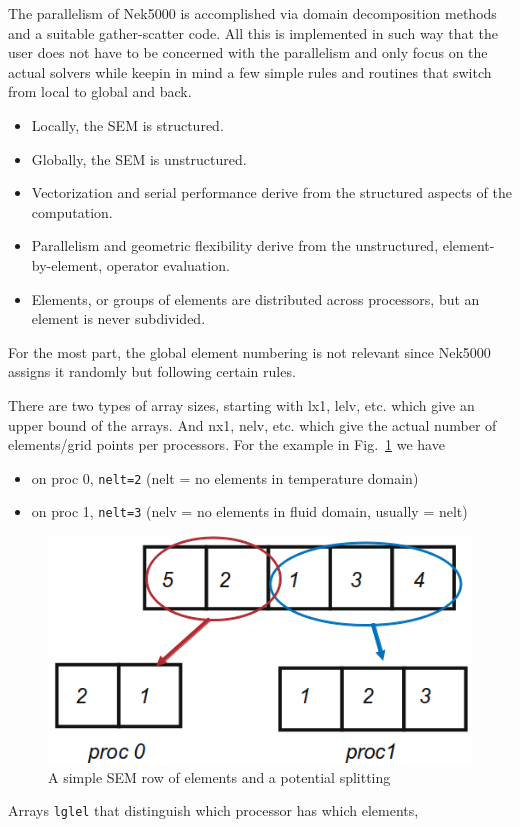 


The parallelism of Nek5000 is accomplished via domain decomposition methods and a suitable gather-scatter code. All this is implemented in such way that the user does not have to be concerned with the parallelism and only focus on the actual solvers while keepin in mind a few simple rules and routines that switch from local to global and back.
\begin{itemize}
\item Locally, the SEM is structured.

\item Globally, the SEM is unstructured.

\item Vectorization and serial performance derive from the structured aspects of the computation.

\item Parallelism and geometric flexibility derive from the unstructured, element-by-element, operator evaluation.

\item Elements, or groups of elements are distributed across processors, but an element is never subdivided.
\end{itemize}

For the most part, the global element numbering is not relevant since Nek5000 assigns it randomly but following certain rules. 

There are two types of array sizes, starting with {\color{red}l}x1, {\color{red}l}elv, etc. which give an upper bound of the arrays. And {\color{red}n}x1, {\color{red}n}elv, etc. which give the actual number of elements/grid points per processors. For the example in Fig.~\ref{fig:procsplit} we have 
\begin{itemize}
\item on proc 0, {\tt nelt=2}  (nelt = no elements in temperature domain)
\item on proc 1, {\tt nelt=3}  (nelv = no elements in fluid domain, usually = nelt)
\end{itemize}

\begin{figure}
\centering
\includegraphics[scale=0.5]{Figs/serial_parallel.png}
\caption{A simple SEM row of elements and a potential splitting}
\label{fig:procsplit}
\end{figure}
Arrays {\tt lglel} that distinguish which processor has which elements, 

